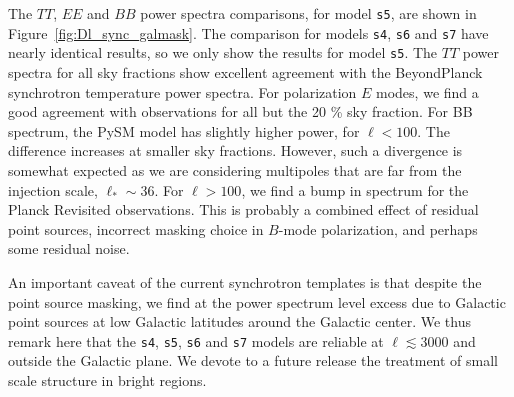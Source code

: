 \documentclass[twocolumn]{aastex631}
\begin{document}
The $TT$, $EE$ and $BB$ power spectra comparisons, for model \texttt{s5}, are shown in Figure~\ref{fig:Dl_sync_galmask}. The comparison for models \texttt{s4}, \texttt{s6} and \texttt{s7} have nearly identical results, so we only show the results for model \texttt{s5}. The $TT$ power spectra for all sky fractions show excellent agreement with the BeyondPlanck synchrotron temperature power spectra. For polarization $E$ modes, we find a good agreement with observations for all but the 20 \% sky fraction. 
For BB spectrum, the PySM model has slightly higher power, for $\ell < 100$. The difference increases at smaller sky fractions. 
However, such a divergence is somewhat expected as we are considering multipoles that are far from the injection scale, $\ell_*\sim36$.
For $\ell > 100$, we find a bump in spectrum for the Planck Revisited observations. This is probably a combined effect of residual point sources, incorrect masking choice in $B$-mode polarization, and perhaps some residual noise.

An important caveat of the current synchrotron templates is that despite the point source masking, we find  at the power spectrum level excess due to Galactic point sources at low  Galactic  latitudes around the Galactic center. We thus remark here that the \texttt{s4}, \texttt{s5}, \texttt{s6} and \texttt{s7} models are reliable at $\ell \lesssim 3000 $ and outside the Galactic plane. We devote to a future release the treatment of small scale structure in bright regions.
\end{document}
